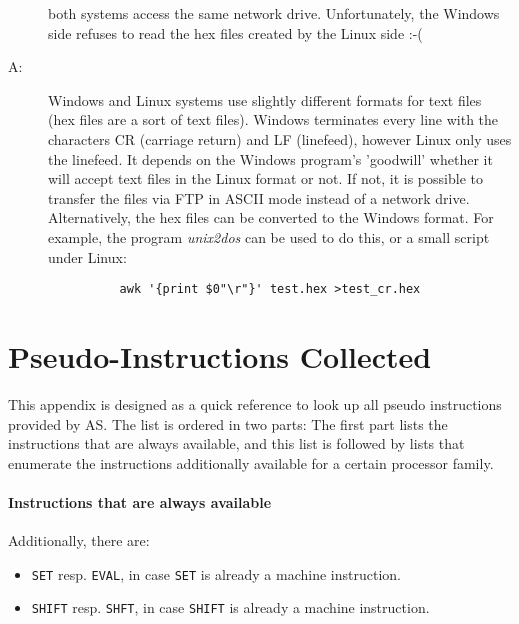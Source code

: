 \documentclass[12pt,twoside]{report}
\newcommand{\tty}[1]{{\tt #1}}
\begin{document}
\begin{description}
{          both systems access the same network drive.  Unfortunately, the
          Windows side refuses to read the hex files created by the Linux
          side :-(}
\item[A:]{Windows and Linux systems use slightly different formats for
          text files (hex files are a sort of text files).  Windows
          terminates every line with the characters CR (carriage return)
          and LF (linefeed), however Linux only uses the linefeed.  It
          depends on the Windows program's 'goodwill' whether it will
          accept text files in the Linux format or not.  If not, it is
          possible to transfer the files via FTP in ASCII mode instead
          of a network drive.  Alternatively, the hex files can be
          converted to the Windows format.  For example, the program
          {\em unix2dos} can be used to do this, or a small script under
          Linux:
          \begin{verbatim}
          awk '{print $0"\r"}' test.hex >test_cr.hex
          \end{verbatim}}
\end{description}


\cleardoublepage
\chapter{Pseudo-Instructions Collected}

This appendix is designed as a quick reference to look up all pseudo
instructions provided by AS.  The list is ordered in two parts: The
first part lists the instructions that are always available, and this
list is followed by lists that enumerate the instructions
additionally available for a certain processor family.

\subsubsection{Instructions that are always available}

Additionally, there are:
\begin{itemize}
\item{\tty{SET} resp. \tty{EVAL}, in case \tty{SET} is already a machine
      instruction.}
\item{\tty{SHIFT} resp. \tty{SHFT}, in case \tty{SHIFT} is already a machine
      instruction.}
\end{itemize}
\end{document}
